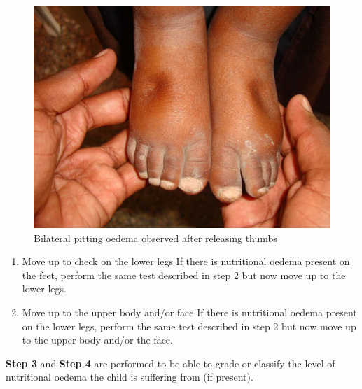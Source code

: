 \documentclass[12pt,]{book}
\theoremstyle{definition}
\theoremstyle{definition}
\theoremstyle{definition}
\theoremstyle{remark}
\begin{document}
\begin{figure}

{\centering \includegraphics[width=6.94in]{images/oedemaStep2} 

}

\caption{Bilateral pitting oedema observed after releasing thumbs}\label{fig:oedemaStep2}
\end{figure}

\begin{enumerate}
\def\labelenumi{\arabic{enumi}.}
\setcounter{enumi}{2}
\item
  Move up to check on the lower legs If there is nutritional oedema
  present on the feet, perform the same test described in step 2 but now
  move up to the lower legs.
\item
  Move up to the upper body and/or face If there is nutritional oedema
  present on the lower legs, perform the same test described in step 2
  but now move up to the upper body and/or the face.
\end{enumerate}

\textbf{Step 3} and \textbf{Step 4} are performed to be able to grade or
classify the level of nutritional oedema the child is suffering from (if
present).
\end{document}

